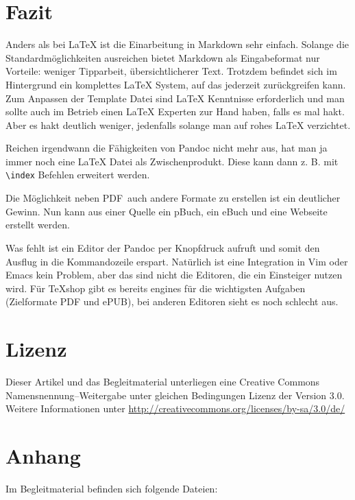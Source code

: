 \documentclass[11pt,ngerman,a4paper]{article}
\begin{document}
\section{Fazit}

Anders als bei LaTeX ist die Einarbeitung in Markdown sehr einfach.
Solange die Standardmöglichkeiten ausreichen bietet Markdown als
Eingabeformat nur Vorteile: weniger Tipparbeit, übersichtlicherer Text.
Trotzdem befindet sich im Hintergrund ein komplettes LaTeX System, auf
das jederzeit zurückgreifen kann. Zum Anpassen der Template Datei sind
LaTeX Kenntnisse erforderlich und man sollte auch im Betrieb einen LaTeX
Experten zur Hand haben, falls es mal hakt. Aber es hakt deutlich
weniger, jedenfalls solange man auf rohes LaTeX verzichtet.

Reichen irgendwann die Fähigkeiten von Pandoc nicht mehr aus, hat man ja
immer noch eine LaTeX Datei als Zwischenprodukt. Diese kann dann z. B.
mit \texttt{\textbackslash{}index} Befehlen erweitert werden.

Die Möglichkeit neben PDF~auch andere Formate zu erstellen ist ein
deutlicher Gewinn. Nun kann aus einer Quelle ein pBuch, ein eBuch und
eine Webseite erstellt werden.

Was fehlt ist ein Editor der Pandoc per Knopfdruck aufruft und somit den
Ausflug in die Kommandozeile erspart. Natürlich ist eine Integration in
Vim oder Emacs kein Problem, aber das sind nicht die Editoren, die ein
Einsteiger nutzen wird. Für TeXshop gibt es bereits engines für die
wichtigsten Aufgaben (Zielformate PDF und ePUB), bei anderen Editoren
sieht es noch schlecht aus.

\section{Lizenz}

Dieser Artikel und das Begleitmaterial unterliegen eine Creative Commons
Namensnennung--Weitergabe unter gleichen Bedingungen Lizenz der Version
3.0. Weitere Informationen unter
\url{http://creativecommons.org/licenses/by-sa/3.0/de/}

\section{Anhang}

Im Begleitmaterial befinden sich folgende Dateien:
\end{document}
